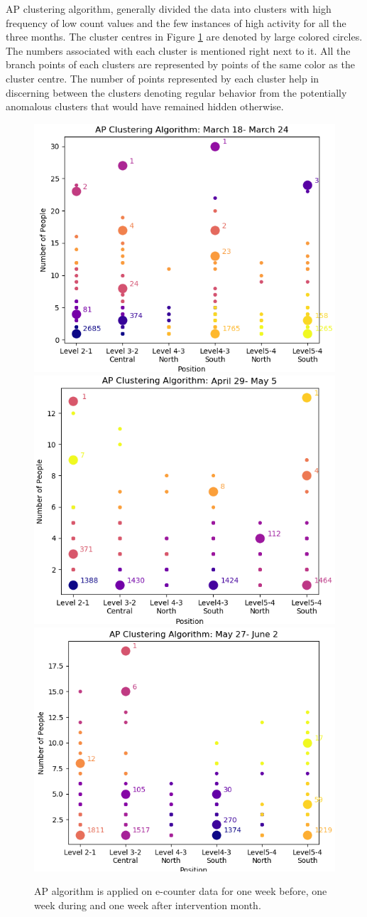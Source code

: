AP clustering algorithm, generally divided the data into clusters with high frequency of low count values and the few instances of high activity for all the three months. The cluster centres in Figure \ref{oneweek} are denoted by large colored circles. The numbers associated with each cluster is mentioned right next to it. All the branch points of each clusters are represented by points of the same color as the cluster centre. The number of points represented by each cluster help in discerning between the clusters denoting regular behavior from the potentially anomalous clusters that would have remained hidden otherwise. 

\begin{figure}[!t]
\centering
\includegraphics[width=.49\textwidth]{image/Chapters/Chapter6/ApFirstWeekBeforeInt.png}
    \includegraphics[width=.49\textwidth]{image/Chapters/Chapter6/ApFirstWeekIntervention.png}\hfill\centering
    \includegraphics[width=.5\textwidth]{image/Chapters/Chapter6/ApFirstWeekAfterInt.png}
    \\[\smallskipamount]
\caption{AP algorithm is applied on e-counter data for one week before, one week during and one week after intervention month. } 
\label{oneweek}
\end{figure}
 
